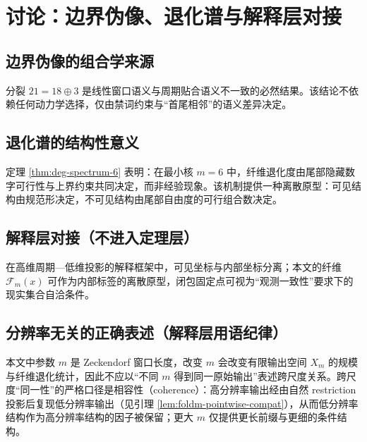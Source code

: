 \section{讨论：边界伪像、退化谱与解释层对接}

\subsection{边界伪像的组合学来源}

分裂 $21=18\oplus 3$ 是线性窗口语义与周期贴合语义不一致的必然结果。该结论不依赖任何动力学选择，仅由禁词约束与“首尾相邻”的语义差异决定。

\subsection{退化谱的结构性意义}

定理 \ref{thm:deg-spectrum-6} 表明：在最小核 $m=6$ 中，纤维退化度由尾部隐藏数字可行性与上界约束共同决定，而非经验现象。该机制提供一种离散原型：可见结构由规范形决定，不可见结构由尾部自由度的可行组合数决定。

\subsection{解释层对接（不进入定理层）}

在高维周期—低维投影的解释框架中，可见坐标与内部坐标分离；本文的纤维 $\mathcal{F}_m(x)$ 可作为内部标签的离散原型，闭包固定点可视为“观测一致性”要求下的现实集合自洽条件。

\subsection{分辨率无关的正确表述（解释层用语纪律）}

本文中参数 $m$ 是 Zeckendorf 窗口长度，改变 $m$ 会改变有限输出空间 $X_m$ 的规模与纤维退化统计，因此不应以“不同 $m$ 得到同一原始输出”表述跨尺度关系。跨尺度“同一性”的严格口径是相容性（coherence）：高分辨率输出经由自然 restriction 投影后复现低分辨率输出（见引理 \ref{lem:foldm-pointwise-compat}），从而低分辨率结构作为高分辨率结构的因子被保留；更大 $m$ 仅提供更长前缀与更细的条件结构。

